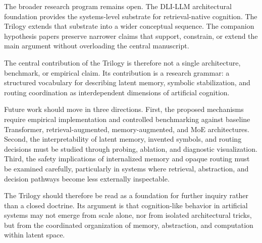 The broader research program remains open. The DLI-LLM architectural foundation provides the systems-level substrate for retrieval-native cognition. The Trilogy extends that substrate into a wider conceptual sequence. The companion hypothesis papers preserve narrower claims that support, constrain, or extend the main argument without overloading the central manuscript.

The central contribution of the Trilogy is therefore not a single architecture, benchmark, or empirical claim. Its contribution is a research grammar: a structured vocabulary for describing latent memory, symbolic stabilization, and routing coordination as interdependent dimensions of artificial cognition.

Future work should move in three directions. First, the proposed mechanisms require empirical implementation and controlled benchmarking against baseline Transformer, retrieval-augmented, memory-augmented, and MoE architectures. Second, the interpretability of latent memory, invented symbols, and routing decisions must be studied through probing, ablation, and diagnostic visualization. Third, the safety implications of internalized memory and opaque routing must be examined carefully, particularly in systems where retrieval, abstraction, and decision pathways become less externally inspectable.

The Trilogy should therefore be read as a foundation for further inquiry rather than a closed doctrine. Its argument is that cognition-like behavior in artificial systems may not emerge from scale alone, nor from isolated architectural tricks, but from the coordinated organization of memory, abstraction, and computation within latent space.
